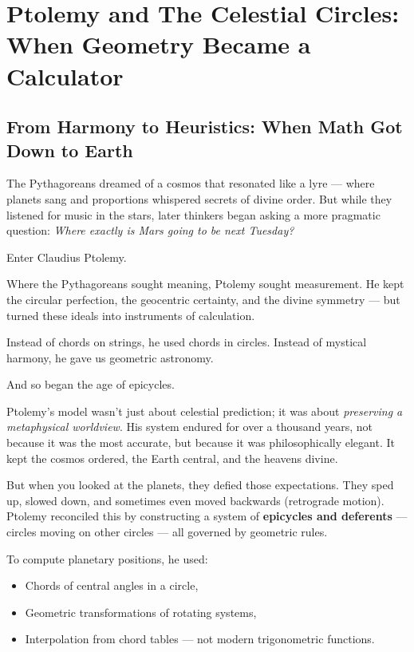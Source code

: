 
\section{Ptolemy and The Celestial Circles: When Geometry Became a Calculator}

\subsection{From Harmony to Heuristics: When Math Got Down to Earth}

The Pythagoreans dreamed of a cosmos that resonated like a lyre — where planets sang and proportions whispered secrets of divine order. But while they listened for music in the stars, later thinkers began asking a more pragmatic question: \textit{Where exactly is Mars going to be next Tuesday?}

Enter Claudius Ptolemy.

Where the Pythagoreans sought meaning, Ptolemy sought measurement. He kept the circular perfection, the geocentric certainty, and the divine symmetry — but turned these ideals into instruments of calculation.

Instead of chords on strings, he used chords in circles. Instead of mystical harmony, he gave us geometric astronomy.

And so began the age of epicycles.

Ptolemy’s model wasn’t just about celestial prediction; it was about \emph{preserving a metaphysical worldview}. His system endured for over a thousand years, not because it was the most accurate, but because it was philosophically elegant. It kept the cosmos ordered, the Earth central, and the heavens divine.

But when you looked at the planets, they defied those expectations. They sped up, slowed down, and sometimes even moved backwards (retrograde motion). Ptolemy reconciled this by constructing a system of \textbf{epicycles and deferents} — circles moving on other circles — all governed by geometric rules.

To compute planetary positions, he used:

\begin{itemize}
    \item Chords of central angles in a circle,
    \item Geometric transformations of rotating systems,
    \item Interpolation from chord tables — not modern trigonometric functions.
\end{itemize}

